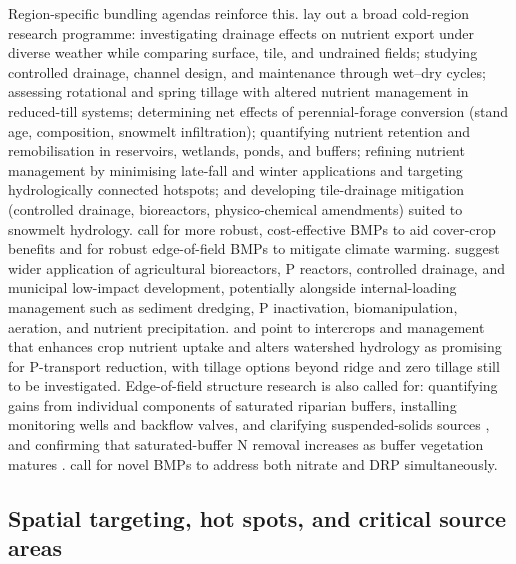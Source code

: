 \documentclass[11pt]{article}
\begin{document}
Region-specific bundling agendas reinforce this. \textcite{Baulch2019} lay out a broad cold-region research programme: investigating drainage effects on nutrient export under diverse weather while comparing surface, tile, and undrained fields; studying controlled drainage, channel design, and maintenance through wet--dry cycles; assessing rotational and spring tillage with altered nutrient management in reduced-till systems; determining net effects of perennial-forage conversion (stand age, composition, snowmelt infiltration); quantifying nutrient retention and remobilisation in reservoirs, wetlands, ponds, and buffers; refining nutrient management by minimising late-fall and winter applications and targeting hydrologically connected hotspots; and developing tile-drainage mitigation (controlled drainage, bioreactors, physico-chemical amendments) suited to snowmelt hydrology. \textcite{Gupta2023} call for more robust, cost-effective BMPs to aid cover-crop benefits and for robust edge-of-field BMPs to mitigate climate warming. \textcite{Husk2024} suggest wider application of agricultural bioreactors, P reactors, controlled drainage, and municipal low-impact development, potentially alongside internal-loading management such as sediment dredging, P inactivation, biomanipulation, aeration, and nutrient precipitation. \textcite{HernandezRamirez2011} and \textcite{GAYNOR1995b} point to intercrops and management that enhances crop nutrient uptake and alters watershed hydrology as promising for P-transport reduction, with tillage options beyond ridge and zero tillage still to be investigated. Edge-of-field structure research is also called for: quantifying gains from individual components of saturated riparian buffers, installing monitoring wells and backflow valves, and clarifying suspended-solids sources \parencite{Singh2024b}, and confirming that saturated-buffer N removal increases as buffer vegetation matures \parencite{Jaynes2019}. \textcite{Spiese2023} call for novel BMPs to address both nitrate and DRP simultaneously.

\subsection{Spatial targeting, hot spots, and critical source areas}
\end{document}
